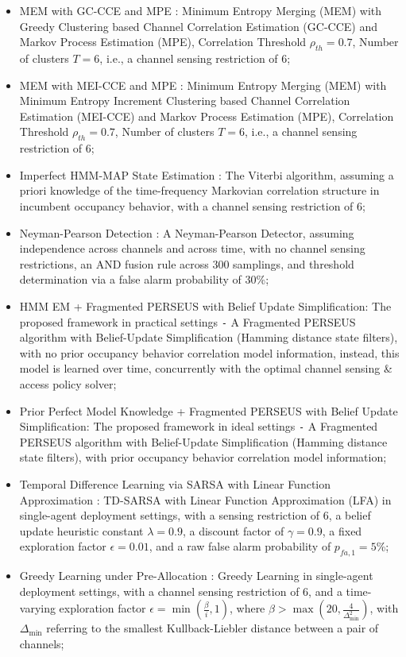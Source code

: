 \documentclass[12pt, draftcls, onecolumn]{IEEEtran}
\begin{document}
\begin{itemize}
    \item MEM with GC-CCE and MPE \cite{WCL:7}: Minimum Entropy Merging (MEM) with Greedy Clustering based Channel Correlation Estimation (GC-CCE) and Markov Process Estimation (MPE), Correlation Threshold $\rho_{th}{=}0.7$, Number of clusters $T{=}6$, i.e., a channel sensing restriction of $6$;
    \item MEM with MEI-CCE and MPE \cite{WCL:7}: Minimum Entropy Merging (MEM) with Minimum Entropy Increment Clustering based Channel Correlation Estimation (MEI-CCE) and Markov Process Estimation (MPE), Correlation Threshold $\rho_{th}{=}0.7$, Number of clusters $T{=}6$, i.e., a channel sensing restriction of $6$;
    \item Imperfect HMM-MAP State Estimation \cite{WCL:6}: The Viterbi algorithm, assuming a priori knowledge of the time-frequency Markovian correlation structure in incumbent occupancy behavior, with a channel sensing restriction of $6$;
    \item Neyman-Pearson Detection \cite{WCL:11}: A Neyman-Pearson Detector, assuming independence across channels and across time, with no channel sensing restrictions, an AND fusion rule across $300$ samplings, and threshold determination via a false alarm probability of $30$\%;
    \item HMM EM + Fragmented PERSEUS with Belief Update Simplification: The proposed framework in practical settings \texttt{-} A Fragmented PERSEUS algorithm with Belief-Update Simplification (Hamming distance state filters), with no prior occupancy behavior correlation model information, instead, this model is learned over time, concurrently with the optimal channel sensing \& access policy solver;
    \item Prior Perfect Model Knowledge + Fragmented PERSEUS with Belief Update Simplification: The proposed framework in ideal settings \texttt{-} A Fragmented PERSEUS algorithm with Belief-Update Simplification (Hamming distance state filters), with prior occupancy behavior correlation model information;
    \item Temporal Difference Learning via SARSA with Linear Function Approximation \cite{WCL:5}: TD-SARSA with Linear Function Approximation (LFA) in single-agent deployment settings, with a sensing restriction of $6$, a belief update heuristic constant $\lambda{=}0.9$, a discount factor of $\gamma{=}0.9$, a fixed exploration factor $\epsilon{=}0.01$, and a raw false alarm probability of $p_{fa,1}{=}5$\%;
    \item Greedy Learning under Pre-Allocation \cite{WCL:MIT}: Greedy Learning in single-agent deployment settings, with a channel sensing restriction of $6$, and a time-varying exploration factor $\epsilon{=}\min(\frac{\beta}{i}, 1)$, where $\beta{>}\max(20, \frac{4}{\Delta_{\text{min}}^{2}})$, with $\Delta_{\text{min}}$ referring to the smallest Kullback-Liebler distance between a pair of channels;

\end{itemize}
\end{document}
